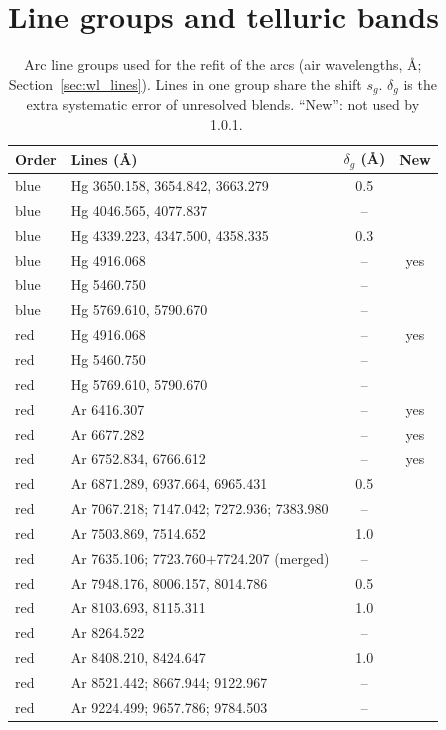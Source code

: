 \chapter{Line groups and telluric bands}
\label{app:tables}

\begin{table}
\centering
\caption{Arc line groups used for the refit of the arcs (air wavelengths, \AA; Section~\ref{sec:wl_lines}). Lines in one group share the shift $s_g$.
$\delta_g$ is the extra systematic error of unresolved blends. ``New'': not used by \banzai{}~1.0.1.}
\label{tab:groups}
\begin{tabular}{llcc}
\toprule
Order & Lines (\AA) & $\delta_g$ (\AA) & New \\
\midrule
blue & Hg 3650.158, 3654.842, 3663.279 & 0.5 & \\
blue & Hg 4046.565, 4077.837 & -- & \\
blue & Hg 4339.223, 4347.500, 4358.335 & 0.3 & \\
blue & Hg 4916.068 & -- & yes \\
blue & Hg 5460.750 & -- & \\
blue & Hg 5769.610, 5790.670 & -- & \\
red & Hg 4916.068 & -- & yes \\
red & Hg 5460.750 & -- & \\
red & Hg 5769.610, 5790.670 & -- & \\
red & Ar 6416.307 & -- & yes \\
red & Ar 6677.282 & -- & yes \\
red & Ar 6752.834, 6766.612 & -- & yes \\
red & Ar 6871.289, 6937.664, 6965.431 & 0.5 & \\
red & Ar 7067.218; 7147.042; 7272.936; 7383.980 & -- & \\
red & Ar 7503.869, 7514.652 & 1.0 & \\
red & Ar 7635.106; 7723.760+7724.207 (merged) & -- & \\
red & Ar 7948.176, 8006.157, 8014.786 & 0.5 & \\
red & Ar 8103.693, 8115.311 & 1.0 & \\
red & Ar 8264.522 & -- & \\
red & Ar 8408.210, 8424.647 & 1.0 & \\
red & Ar 8521.442; 8667.944; 9122.967 & -- & \\
red & Ar 9224.499; 9657.786; 9784.503 & -- & \\
\bottomrule
\end{tabular}
\end{table}

